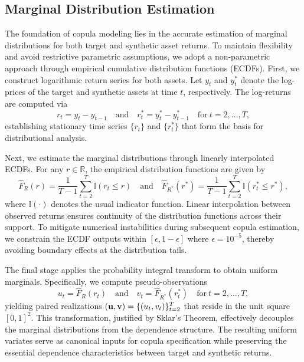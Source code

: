 \subsection{Marginal Distribution Estimation}
The foundation of copula modeling lies in the accurate estimation of marginal distributions for both target and synthetic asset returns. To maintain flexibility and avoid restrictive parametric assumptions, we adopt a non-parametric approach through empirical cumulative distribution functions (ECDFs).
First, we construct logarithmic return series for both assets. Let $y_t$ and $y_t^*$ denote the log-prices of the target and synthetic assets at time $t$, respectively. The log-returns are computed via  
$$
r_t = y_t - y_{t-1} \quad \text{and} \quad r_t^* = y_t^* - y_{t-1}^* \quad \text{for}\ t = 2,\ldots,T,
$$  
establishing stationary time series $\{r_t\}$ and $\{r_t^*\}$ that form the basis for distributional analysis.

Next, we estimate the marginal distributions through linearly interpolated ECDFs. For any $r \in \mathbb{R}$, the empirical distribution functions are given by  
$$
\hat{F}_{R}(r) = \frac{1}{T-1} \sum_{t=2}^T \mathbb{I}(r_t \leq r) \quad \text{and} \quad \hat{F}_{R^*}(r^*) = \frac{1}{T-1} \sum_{t=2}^T \mathbb{I}(r_t^* \leq r^*),
$$  
where $\mathbb{I}(\cdot)$ denotes the usual indicator function. Linear interpolation between observed returns ensures continuity of the distribution functions across their support. To mitigate numerical instabilities during subsequent copula estimation, we constrain the ECDF outputs within $[\epsilon, 1-\epsilon]$ where $\epsilon = 10^{-5}$, thereby avoiding boundary effects at the distribution tails.

The final stage applies the probability integral transform to obtain uniform marginals. Specifically, we compute pseudo-observations  
$$
u_t = \hat{F}_R(r_t) \quad \text{and} \quad v_t = \hat{F}_{R^*}(r_t^*) \quad \text{for}\ t = 2,\ldots,T,
$$  
yielding paired realizations $(\mathbf {u,v})=\{(u_t,v_t)\}_{t=2}^T$ that reside in the unit square $[0,1]^2$. This transformation, justified by Sklar's Theorem, effectively decouples the marginal distributions from the dependence structure. The resulting uniform variates serve as canonical inputs for copula specification while preserving the essential dependence characteristics between target and synthetic returns.


